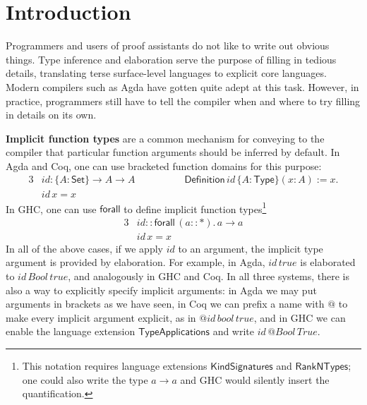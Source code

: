 \documentclass[acmsmall,review,anonymous,prologue,dvipsnames]{acmart}\settopmatter{printfolios=true,printccs=false,printacmref=false}
\newcommand{\kw}[1]{{\mathsf{#1}}}
\theoremstyle{remark}
\begin{document}

\maketitle


\section{Introduction}
\label{sec:introduction}

Programmers and users of proof assistants do not like to write out obvious
things. Type inference and elaboration serve the purpose of filling in tedious
details, translating terse surface-level languages to explicit core
languages. Modern compilers such as Agda have gotten quite adept at this
task. However, in practice, programmers still have to tell the compiler when and
where to try filling in details on its own.

\textbf{Implicit function types} are a common mechanism for conveying to the
compiler that particular function arguments should be inferred by default. In
Agda and Coq, one can use bracketed function domains for this purpose:
\begin{alignat*}{3}
  & id : \{A : \kw{Set}\}\to A \to A \hspace{5em} \kw{Definition}\,id\,\{A : \kw{Type}\}(x : A) := x.\\
  & id\,x = x
\end{alignat*}
In GHC, one can use $\kw{forall}$ to define implicit function
types\footnote{This notation requires language extensions
  $\mathsf{KindSignatures}$ and $\mathsf{RankNTypes}$; one could also write the type
  $a \to a$ and GHC would silently insert the quantification.}
\begin{alignat*}{3}
  & id :: \kw{forall}\,(a :: \kw{*}).\,a \to a\\
  & id\,x = x
\end{alignat*}
In all of the above cases, if we apply $id$ to an argument, the implicit type
argument is provided by elaboration. For example, in Agda, $id\,true$ is
elaborated to $id\,Bool\,true$, and analogously in GHC and Coq. In all three
systems, there is also a way to explicitly specify implicit arguments: in Agda
we may put arguments in brackets as we have seen, in Coq we can prefix a name
with $\kw{@}$ to make every implicit argument explicit, as in
$\kw{@}id\,bool\,true$, and in GHC we can enable the language extension
$\mathsf{TypeApplications}$ and write $id\,\kw{@}Bool\,True$.
\end{document}
